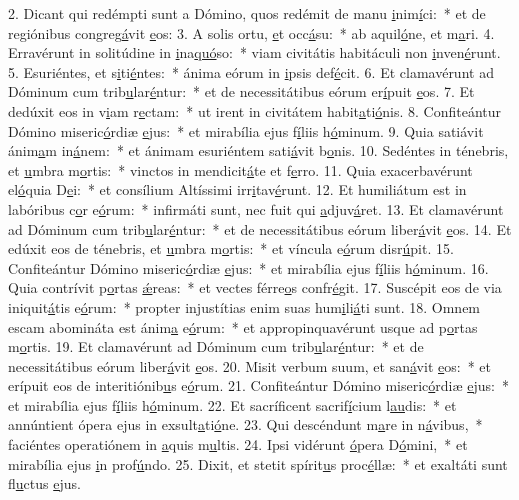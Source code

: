 2. Dicant qui redémpti sunt a Dómino, quos redémit de manu \uline{i}nim\uline{í}ci:~* et de regiónibus congreg\uline{á}vit \uline{e}os:
3. A solis ortu, \uline{e}t occ\uline{á}su:~* ab aquil\uline{ó}ne, et m\uline{a}ri.
4. Erravérunt in solitúdine in \uline{i}na\uline{quó}so:~* viam civitátis habitáculi non \uline{i}nven\uline{é}runt.
5. Esuriéntes, et s\uline{i}ti\uline{é}ntes:~* ánima eórum in \uline{i}psis def\uline{é}cit.
6. Et clamavérunt ad Dóminum cum trib\uline{u}lar\uline{é}ntur:~* et de necessitátibus eórum er\uline{í}puit \uline{e}os.
7. Et dedúxit eos in v\uline{i}am r\uline{e}ctam:~* ut irent in civitátem habit\uline{a}ti\uline{ó}nis.
8. Confiteántur Dómino miseric\uline{ó}rdiæ \uline{e}jus:~* et mirabília ejus f\uline{í}liis h\uline{ó}minum.
9. Quia satiávit ánim\uline{a}m in\uline{á}nem:~* et ánimam esuriéntem sati\uline{á}vit b\uline{o}nis.
10. Sedéntes in ténebris, et \uline{u}mbra m\uline{o}rtis:~* vinctos in mendicit\uline{á}te et f\uline{e}rro.
11. Quia exacerbavérunt el\uline{ó}quia D\uline{e}i:~* et consílium Altíssimi irr\uline{i}tav\uline{é}runt.
12. Et humiliátum est in labóribus c\uline{o}r e\uline{ó}rum:~* infirmáti sunt, nec fuit qui \uline{a}djuv\uline{á}ret.
13. Et clamavérunt ad Dóminum cum trib\uline{u}lar\uline{é}ntur:~* et de necessitátibus eórum liber\uline{á}vit \uline{e}os.
14. Et edúxit eos de ténebris, et \uline{u}mbra m\uline{o}rtis:~* et víncula e\uline{ó}rum disr\uline{ú}pit.
15. Confiteántur Dómino miseric\uline{ó}rdiæ \uline{e}jus:~* et mirabília ejus f\uline{í}liis h\uline{ó}minum.
16. Quia contrívit p\uline{o}rtas \uline{ǽ}reas:~* et vectes férre\uline{o}s confr\uline{é}git.
17. Suscépit eos de via iniquit\uline{á}tis e\uline{ó}rum:~* propter injustítias enim suas hum\uline{i}li\uline{á}ti sunt.
18. Omnem escam abomináta est ánim\uline{a} e\uline{ó}rum:~* et appropinquavérunt usque ad p\uline{o}rtas m\uline{o}rtis.
19. Et clamavérunt ad Dóminum cum trib\uline{u}lar\uline{é}ntur:~* et de necessitátibus eórum liber\uline{á}vit \uline{e}os.
20. Misit verbum suum, et san\uline{á}vit \uline{e}os:~* et erípuit eos de interitiónib\uline{u}s e\uline{ó}rum.
21. Confiteántur Dómino miseric\uline{ó}rdiæ \uline{e}jus:~* et mirabília ejus f\uline{í}liis h\uline{ó}minum.
22. Et sacríficent sacrif\uline{í}cium l\uline{au}dis:~* et annúntient ópera ejus in exsult\uline{a}ti\uline{ó}ne.
23. Qui descéndunt m\uline{a}re in n\uline{á}vibus,~* faciéntes operatiónem in \uline{a}quis m\uline{u}ltis.
24. Ipsi vidérunt \uline{ó}pera D\uline{ó}mini,~* et mirabília ejus \uline{i}n prof\uline{ú}ndo.
25. Dixit, et stetit spírit\uline{u}s proc\uline{é}llæ:~* et exaltáti sunt fl\uline{u}ctus \uline{e}jus.
